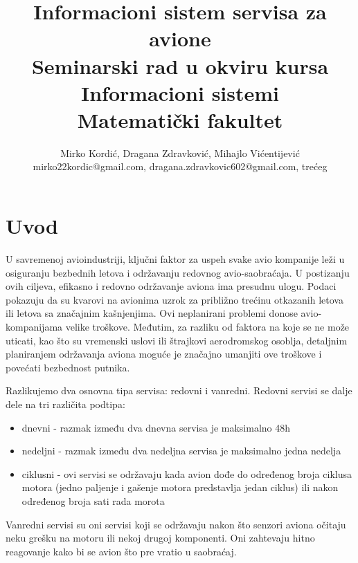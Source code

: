 \documentclass[a4paper]{article}
\begin{document}
\title{Informacioni sistem servisa za avione\\ \small{Seminarski rad u okviru kursa\\Informacioni sistemi\\ Matematički fakultet}}

\author{Mirko Kordić, Dragana Zdravković, Mihajlo Vićentijević\\ mirko22kordic@gmail.com, dragana.zdravkovic602@gmail.com, trećeg}


\maketitle

\abstract{
}

\tableofcontents

\newpage

\section{Uvod}
\label{sec:uvod}
U savremenoj avioindustriji, ključni faktor za uspeh svake avio kompanije leži u osiguranju bezbednih letova i održavanju redovnog avio-saobraćaja. U postizanju ovih ciljeva, efikasno i redovno održavanje aviona ima presudnu ulogu. Podaci pokazuju da su kvarovi na avionima uzrok za približno trećinu otkazanih letova ili letova sa značajnim kašnjenjima. Ovi neplanirani problemi donose avio-kompanijama velike troškove. Međutim, za razliku od faktora na koje se ne može uticati, kao što su vremenski uslovi ili štrajkovi aerodromskog osoblja, detaljnim planiranjem održavanja aviona moguće je značajno umanjiti ove troškove i povećati bezbednost putnika.

Razlikujemo dva osnovna tipa servisa: redovni i vanredni. Redovni servisi se dalje dele na tri različita podtipa:
\begin{itemize}
    \item dnevni - razmak između dva dnevna servisa je maksimalno 48h
    \item nedeljni - razmak između dva nedeljna servisa je maksimalno jedna nedelja
    \item ciklusni - ovi servisi se održavaju kada avion dođe do određenog broja ciklusa motora (jedno paljenje i gašenje motora predstavlja jedan ciklus) ili nakon određenog broja sati rada morota
\end{itemize}

Vanredni servisi su oni servisi koji se održavaju nakon što senzori aviona očitaju neku grešku na motoru ili nekoj drugoj komponenti. Oni zahtevaju hitno reagovanje kako bi se avion što pre vratio u saobraćaj. 
\end{document}
